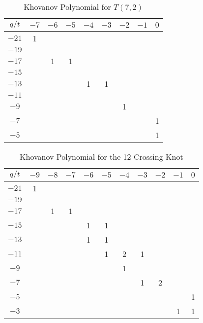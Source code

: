 \documentclass{article}
\theoremstyle{plain}
\begin{document}
        \begin{table}[H]
            \centering
            \begin{tabular}{| c | c | c | c | c | c | c | c | c |}
                \hline
                $q/t$&$-7$&$-6$&$-5$&$-4$&$-3$&$-2$&$-1$&$0$\\
                \hline
                $-21$&1&&&&&&&\\
                \hline
                $-19$&&&&&&&&\\
                \hline
                $-17$&&1&1&&&&&\\
                \hline
                $-15$&&&&&&&&\\
                \hline
                $-13$&&&&1&1&&&\\
                \hline
                $-11$&&&&&&&&\\
                \hline
                $-9$&&&&&&1&&\\
                \hline
                $-7$&&&&&&&&1\\
                \hline
                $-5$&&&&&&&&1\\
                \hline
            \end{tabular}
            \caption{Khovanov Polynomial for $T(7,2)$}
        \end{table}
        \begin{table}[H]
            \centering
            \begin{tabular}{| c | c | c | c | c | c | c | c | c | c | c |}
                \hline
                $q/t$&$-9$&$-8$&$-7$&$-6$&$-5$&$-4$&$-3$&$-2$&$-1$&$0$\\
                \hline
                $-21$&1&&&&&&&&&\\
                \hline
                $-19$&&&&&&&&&&\\
                \hline
                $-17$&&1&1&&&&&&&\\
                \hline
                $-15$&&&&1&1&&&&&\\
                \hline
                $-13$&&&&1&1&&&&&\\
                \hline
                $-11$&&&&&1&2&1&&&\\
                \hline
                $-9$&&&&&&1&&&&\\
                \hline
                $-7$&&&&&&&1&2&&\\
                \hline
                $-5$&&&&&&&&&&1\\
                \hline
                $-3$&&&&&&&&&1&1\\
                \hline
            \end{tabular}
            \caption{Khovanov Polynomial for the 12 Crossing Knot}
        \end{table}
\end{document}
